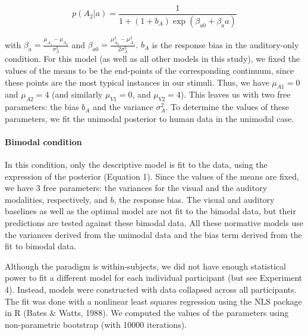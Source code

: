\documentclass[english,,man,floatsintext]{apa6}
\let\oldparagraph\paragraph
\renewcommand{\paragraph}[1]{\oldparagraph{#1}\mbox{}}
\theoremstyle{definition}
\theoremstyle{definition}
\theoremstyle{definition}
\theoremstyle{remark}
\begin{document}
\[p(A_2 | a)=\frac{1}{1+(1+b_A)\exp(\beta_{a0}+\beta_aa)}\]

with \(\beta_a=\frac{\mu_{A_1}-\mu_{A_2}}{\sigma^2_{A}}\) and
\(\beta_{a0}=\frac{\mu^2_{A_2}-\mu^2_{A_1}}{2\sigma^2_{A}}\). \(b_A\) is
the response bias in the auditory-only condition. For this model (as
well as all other models in this study), we fixed the values of the
means to be the end-points of the corresponding continuum, since these
points are the most typical instances in our stimuli. Thus, we have
\(\mu_{A1}=0\) and \(\mu_{A2}=4\) (and similarly \(\mu_{V1}=0\), and
\(\mu_{V2}=4\)). This leaves us with two free parameters: the bias
\(b_A\) and the variance \(\sigma^2_{A}\). To determine the values of
these parameters, we fit the unimodal posterior to human data in the
unimodal case.

\paragraph{Bimodal condition}\label{bimodal-condition}

In this condition, only the descriptive model is fit to the data, using
the expression of the posterior (Equation 1). Since the values of the
means are fixed, we have 3 free parameters: the variances for the visual
and the auditory modalities, respectively, and \(b\), the response bias.
The visual and auditory baselines as well as the optimal model are not
fit to the bimodal data, but their predictions are tested against these
bimodal data. All these normative models use the variances derived from
the unimodal data and the bias term derived from the fit to bimodal
data.

Although the paradigm is within-subjects, we did not have enough
statistical power to fit a different model for each individual
participant (but see Experiment 4). Instead, models were constructed
with data collapsed across all participants. The fit was done with a
nonlinear least squares regression using the NLS package in R (Bates \&
Watts, 1988). We computed the values of the parameters using
non-parametric bootstrap (with 10000 iterations).
\end{document}

